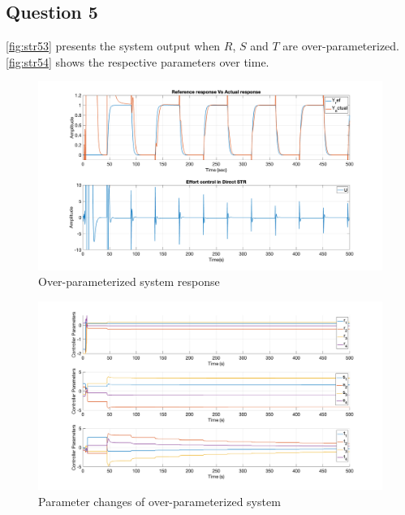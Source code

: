 \FloatBarrier
\subsection{Question 5}
\autoref{fig:str53} presents the system output when $R$, $S$ and $T$ are over-parameterized. \autoref{fig:str54} shows the respective parameters over time.

\begin{figure}
	\centering
	\includegraphics[width=\textwidth]{images/str53.png}
	\caption{Over-parameterized system response}
	\label{fig:str53}
\end{figure}

\begin{figure}
	\centering
	\includegraphics[width=\textwidth]{images/str54.png}
	\caption{Parameter changes of over-parameterized system}
	\label{fig:str54}
\end{figure}
